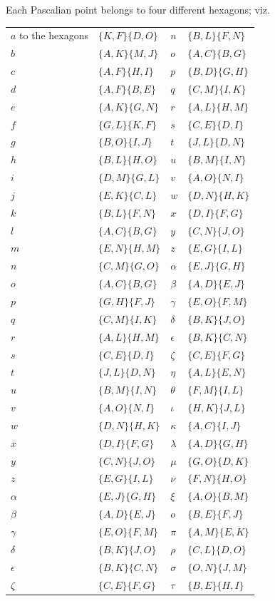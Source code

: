 \documentclass[11pt,a4paper]{article}
\theoremstyle{definition}
\begin{document}
Each Pascalian point belongs to four different hexagons; viz.
\begin{center}
\small
\begin{tabular}{ll|ll}
$a$ to the hexagons & $\{K,F\}\{D,O\}$ & $n$ & $\{B,L\}\{F,N\}$\\
$b$ & $\{A,K\}\{M,J\}$ & $o$ & $\{A,C\}\{B,G\}$\\
$c$ & $\{A,F\}\{H,I\}$ & $p$ & $\{B,D\}\{G,H\}$\\
$d$ & $\{A,F\}\{B,E\}$ & $q$ & $\{C,M\}\{I,K\}$\\
$e$ & $\{A,K\}\{G,N\}$ & $r$ & $\{A,L\}\{H,M\}$\\
$f$ & $\{G,L\}\{K,F\}$ & $s$ & $\{C,E\}\{D,I\}$\\
$g$ & $\{B,O\}\{I,J\}$ & $t$ & $\{J,L\}\{D,N\}$\\
$h$ & $\{B,L\}\{H,O\}$ & $u$ & $\{B,M\}\{I,N\}$\\
$i$ & $\{D,M\}\{G,L\}$ & $v$ & $\{A,O\}\{N,I\}$\\
$j$ & $\{E,K\}\{C,L\}$ & $w$ & $\{D,N\}\{H,K\}$\\
$k$ & $\{B,L\}\{F,N\}$ & $x$ & $\{D,I\}\{F,G\}$\\
$l$ & $\{A,C\}\{B,G\}$ & $y$ & $\{C,N\}\{J,O\}$\\
$m$ & $\{E,N\}\{H,M\}$ & $z$ & $\{E,G\}\{I,L\}$\\
$n$ & $\{C,M\}\{G,O\}$ & $\alpha$ & $\{E,J\}\{G,H\}$\\
$o$ & $\{A,C\}\{B,G\}$ & $\beta$ & $\{A,D\}\{E,J\}$\\
$p$ & $\{G,H\}\{F,J\}$ & $\gamma$ & $\{E,O\}\{F,M\}$\\
$q$ & $\{C,M\}\{I,K\}$ & $\delta$ & $\{B,K\}\{J,O\}$\\
$r$ & $\{A,L\}\{H,M\}$ & $\epsilon$ & $\{B,K\}\{C,N\}$\\
$s$ & $\{C,E\}\{D,I\}$ & $\zeta$ & $\{C,E\}\{F,G\}$\\
$t$ & $\{J,L\}\{D,N\}$ & $\eta$ & $\{A,L\}\{E,N\}$\\
$u$ & $\{B,M\}\{I,N\}$ & $\theta$ & $\{F,M\}\{I,L\}$\\
$v$ & $\{A,O\}\{N,I\}$ & $\iota$ & $\{H,K\}\{J,L\}$\\
$w$ & $\{D,N\}\{H,K\}$ & $\kappa$ & $\{A,C\}\{I,J\}$\\
$x$ & $\{D,I\}\{F,G\}$ & $\lambda$ & $\{A,D\}\{G,H\}$\\
$y$ & $\{C,N\}\{J,O\}$ & $\mu$ & $\{G,O\}\{D,K\}$\\
$z$ & $\{E,G\}\{I,L\}$ & $\nu$ & $\{F,N\}\{H,O\}$\\
$\alpha$ & $\{E,J\}\{G,H\}$ & $\xi$ & $\{A,O\}\{B,M\}$\\
$\beta$ & $\{A,D\}\{E,J\}$ & $o$ & $\{B,E\}\{F,J\}$\\
$\gamma$ & $\{E,O\}\{F,M\}$ & $\pi$ & $\{A,M\}\{E,K\}$\\
$\delta$ & $\{B,K\}\{J,O\}$ & $\rho$ & $\{C,L\}\{D,O\}$\\
$\epsilon$ & $\{B,K\}\{C,N\}$ & $\sigma$ & $\{O,N\}\{J,M\}$\\
$\zeta$ & $\{C,E\}\{F,G\}$ & $\tau$ & $\{B,E\}\{H,I\}$
\end{tabular}
\end{center}
\end{document}
